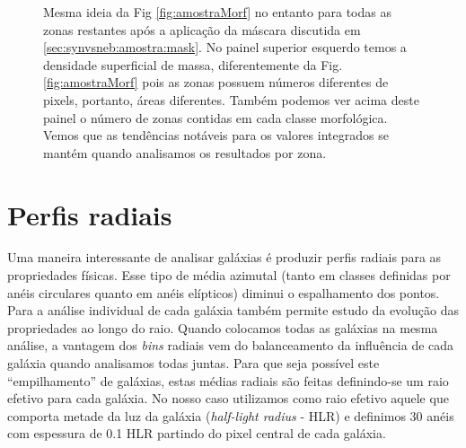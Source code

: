 \begin{figure}
	\centering
	\caption[Classificação por morfologia após máscara.]
	{Mesma ideia da Fig \ref{fig:amostraMorf} no entanto para todas as zonas restantes após a
	aplicação da máscara discutida em \ref{sec:synvsneb:amostra:mask}. No painel superior esquerdo
	temos a densidade superficial de massa, diferentemente da Fig. \ref{fig:amostraMorf} pois as zonas
	possuem números diferentes de pixels, portanto, áreas diferentes. Também podemos ver acima deste
	painel o número de zonas contidas em cada classe morfológica. Vemos que as tendências notáveis para
	os valores integrados se mantém quando analisamos os resultados por zona.}
	\label{fig:amostraRealMorf}
\end{figure}

\section{Perfis radiais}
\label{sec:amostra:rad}

Uma maneira interessante de analisar galáxias é produzir perfis radiais para as propriedades
físicas. Esse tipo de média azimutal (tanto em classes definidas por anéis circulares quanto em
anéis elípticos) diminui o espalhamento dos pontos. Para a análise individual de cada galáxia também
permite estudo da evolução das propriedades ao longo do raio. Quando colocamos todas as galáxias na
mesma análise, a vantagem dos {\em bins} radiais vem do balanceamento da influência de cada galáxia
quando analisamos todas juntas. Para que seja possível este ``empilhamento'' de galáxias, estas
médias radiais são feitas definindo-se um raio efetivo para cada galáxia. No nosso caso utilizamos
como raio efetivo aquele que comporta metade da luz da galáxia ({\em half-light radius} - HLR) e
definimos 30 anéis com espessura de 0.1 HLR partindo do pixel central de cada galáxia. 

